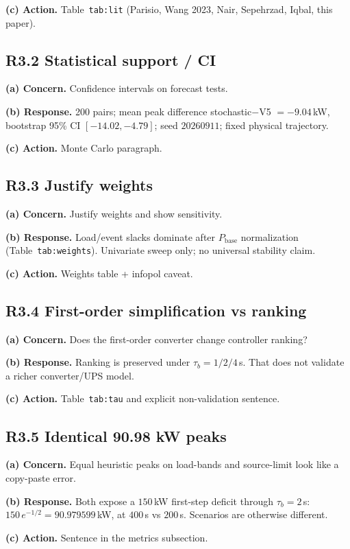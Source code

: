 \documentclass[11pt]{article}
\begin{document}
\textbf{(c) Action.} Table~\texttt{tab:lit} (Parisio, Wang 2023, Nair, Sepehrzad, Iqbal, this paper).

\subsection*{R3.2 Statistical support / CI}
\textbf{(a) Concern.} Confidence intervals on forecast tests.

\textbf{(b) Response.} 200 pairs; mean peak difference stochastic$-$V5 $= -9.04$\,kW, bootstrap 95\% CI $[-14.02,-4.79]$; seed $20260911$; fixed physical trajectory.

\textbf{(c) Action.} Monte Carlo paragraph.

\subsection*{R3.3 Justify weights}
\textbf{(a) Concern.} Justify weights and show sensitivity.

\textbf{(b) Response.} Load/event slacks dominate after $P_{\mathrm{base}}$ normalization (Table~\texttt{tab:weights}). Univariate sweep only; no universal stability claim.

\textbf{(c) Action.} Weights table + infopol caveat.

\subsection*{R3.4 First-order simplification vs ranking}
\textbf{(a) Concern.} Does the first-order converter change controller ranking?

\textbf{(b) Response.} Ranking is preserved under $\tau_b=1/2/4$\,s. That does not validate a richer converter/UPS model.

\textbf{(c) Action.} Table~\texttt{tab:tau} and explicit non-validation sentence.

\subsection*{R3.5 Identical 90.98 kW peaks}
\textbf{(a) Concern.} Equal heuristic peaks on load-bands and source-limit look like a copy-paste error.

\textbf{(b) Response.} Both expose a $150$\,kW first-step deficit through $\tau_b=2$\,s: $150\,e^{-1/2}=90.979599$\,kW, at $400$\,s vs $200$\,s. Scenarios are otherwise different.

\textbf{(c) Action.} Sentence in the metrics subsection.
\end{document}
